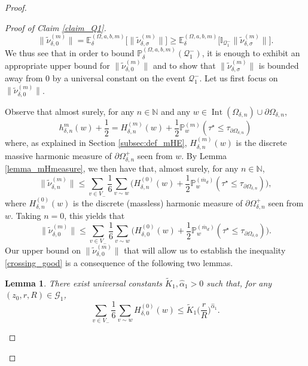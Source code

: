 \documentclass{article}
\newcommand{\PP}{{\mathbb{P}}}
\newcommand{\EE}{{\mathbb{E}}}
\newtheorem{lemma}[theorem]{Lemma}
\theoremstyle{definition}
\theoremstyle{remark}
\theoremstyle{remark}
\begin{document}
\begin{proof}
\begin{proof}[Proof of Claim \ref{claim_Q1}]
\begin{equation} \label{OST_nu}
    \| \tilde \nu_{\delta, 0}^{(m)} \| = \EE_{\delta}^{(\Omega,a,b,m)}\big[\| \tilde \nu_{\delta, \sigma}^{(m)} \| \big] \geq \EE_{\delta}^{(\Omega,a,b,m)}\big[\mathbb{I}_{\mathcal{Q}_{1}^{-}}\| \tilde \nu_{\delta, \sigma}^{(m)} \|\big].
\end{equation}
We thus see that in order to bound $\PP_{\delta}^{(\Omega,a,b,m)}(\mathcal{Q}_{1}^{-})$, it is enough to exhibit an appropriate upper bound for $ \| \tilde \nu_{\delta, 0}^{(m)} \|$ and to show that $\| \tilde \nu_{\delta, \sigma}^{(m)} \|$ is bounded away from $0$ by a universal constant on the event $\mathcal{Q}_{1}^{-}$. Let us first focus on $ \| \tilde \nu_{\delta, 0}^{(m)} \|$.

Observe that almost surely, for any $n \in \mathbb{N}$ and any $w \in \operatorname{Int}(\Omega_{\delta, n}) \cup \partial \Omega_{\delta,n}$,
\begin{equation*}
    h_{\delta, n}^{m}(w) + \frac{1}{2} = H_{\delta, n}^{(m)}(w) + \frac{1}{2}\PP_{w}^{(m)}(\tau^{\star} \leq \tau_{\partial \Omega_{\delta, n}})
\end{equation*}
where, as explained in Section \ref{subsec:def_mHE}, $H_{\delta, n}^{(m)}(w)$ is the discrete massive harmonic measure of $\partial \Omega_{\delta, n}^{+}$ seen from $w$. By Lemma \ref{lemma_mHmeasure}, we then have that, almost surely, for any $n \in \mathbb{N}$,
\begin{equation*}
    \| \tilde \nu_{\delta, n}^{(m)} \| \leq \sum_{v \in V_{-}} \frac{1}{6} \sum_{v \sim w} \bigg( H_{\delta,n}^{(0)}(w) + \frac{1}{2} \PP_{w}^{(\overline{m}_{d})}(\tau^{\star} \leq \tau_{\partial \Omega_{\delta, n}}) \bigg),
\end{equation*}
where $H_{\delta, n}^{(0)}(w)$ is the discrete (massless) harmonic measure of $\partial \Omega_{\delta, n}^{+}$ seen from $w$. Taking $n=0$, this yields that
\begin{equation*}
    \| \tilde \nu_{\delta, 0}^{(m)} \| \leq \sum_{v \in V_{-}} \frac{1}{6} \sum_{v \sim w} \bigg( H_{\delta,0}^{(0)}(w) + \frac{1}{2} \PP_{w}^{(\overline{m}_{d})}(\tau^{\star} \leq \tau_{\partial \Omega_{\delta, 0}}) \bigg).
\end{equation*}
Our upper bound on $\| \tilde \nu_{\delta, 0}^{(m)} \|$ that will allow us to establish the inequality \eqref{crossing_good} is a consequence of the following two lemmas.

\begin{lemma} \label{lemma_upper_Hq1}
There exist universal constants $\tilde K_1 , \hat \alpha_1 > 0$ such that, for any $(z_0,r,R) \in \mathcal{G}_1$,
\begin{equation} \label{harmonic_part}
    \sum_{v \in V_{-}} \frac{1}{6} \sum_{v \sim w} H_{\delta,0}^{(0)}(w) \leq \tilde K_1 \bigg( \frac{r}{R}\bigg)^{\hat \alpha_1}.
\end{equation}
\end{lemma}


\end{proof}
\end{proof}
\end{document}
